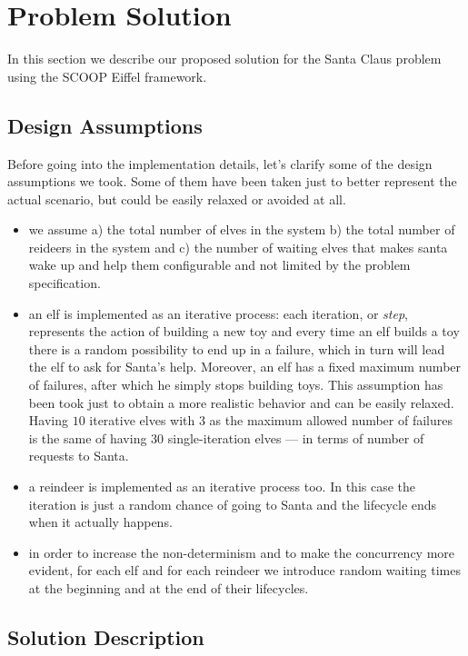 \section{Problem Solution}
\label{sec:solution}

In this section we describe our proposed solution for the Santa Claus problem using the SCOOP Eiffel framework.

\subsection{Design Assumptions}
\label{subsec:design}

Before going into the implementation details, let's clarify some of the design
assumptions we took. Some of them have been taken just to better represent the
actual scenario, but could be easily relaxed or avoided at all.

\begin{itemize}
    \item we assume a) the total number of elves in the system b) the
total number of reideers in the system and c) the number of waiting elves that
makes santa wake up and help them configurable and not limited by
the problem specification.
    \item an elf is implemented as an iterative process: each iteration, or
\textit{step}, represents the action of building a new toy and
every time an elf builds a toy there is a random possibility to end up in a
failure, which in turn will lead the elf to ask for Santa's help. Moreover, an elf
has a fixed maximum number of failures, after which he simply stops building
toys. This assumption has been took just to obtain a more realistic behavior
and can be easily relaxed. Having $10$ iterative elves with 3 as the maximum allowed
number of failures is the same of having $30$ single-iteration elves --- in terms of
number of requests to Santa.
    \item a reindeer is implemented as an iterative process too. In this case
the iteration is just a random chance of going to Santa and the lifecycle ends
when it actually happens.
    \item in order to increase the non-determinism and to make the concurrency
more evident, for each elf and for each reindeer we introduce random waiting
times at the beginning and at the end of their lifecycles.
\end{itemize}

\subsection{Solution Description}
\label{subsec:sol}

